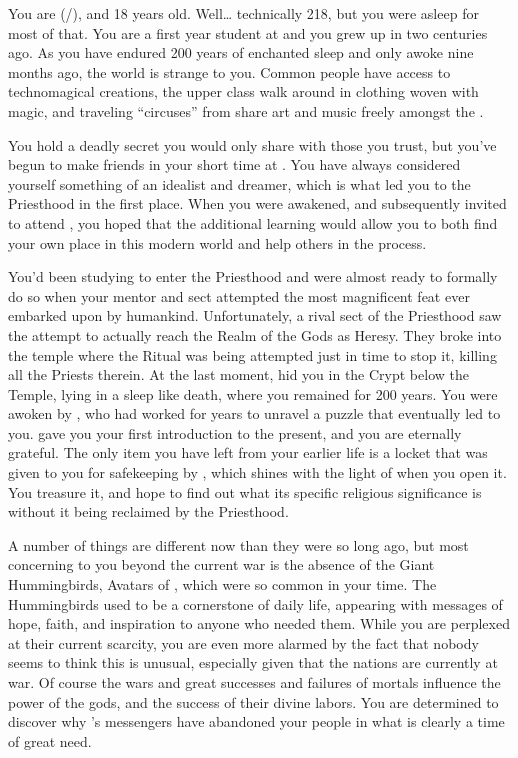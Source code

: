 \documentclass[char]{GL2020}
\begin{document}
\name{\cDisney{}}


You are \cDisney{} (\cDisney{\they}/\cDisney{\them}), and 18 years old. Well… technically 218, but you were asleep for most of that. You are a first year student at \pSchool{} and you grew up in \pFarm{} two centuries ago. As you have endured 200 years of enchanted sleep and only awoke nine months ago, the world is strange to you.  Common people have access to technomagical creations, the upper class walk around in clothing woven with magic, and traveling “circuses” from \pTech{} share art and music freely amongst the \pFarmers{}.

You hold a deadly secret you would only share with those you trust, but you’ve begun to make friends in your short time at \pSchool{}. You have always considered yourself something of an idealist and dreamer, which is what led you to the Priesthood in the first place.  When you were awakened, and subsequently invited to attend \pSchool{}, you hoped that the additional learning would allow you to both find your own place in this modern world and help others in the process.

You’d been studying to enter the Priesthood and were almost ready to formally do so when your mentor \cDisneyMentor{} and \cDisneyMentor{\their} sect attempted the most magnificent feat ever embarked upon by humankind.  Unfortunately, a rival sect of the Priesthood saw the attempt to actually reach the Realm of the Gods as Heresy.  They broke into the temple where the Ritual was being attempted just in time to stop it, killing all the Priests therein.  At the last moment, \cDisneyMentor{} hid you in the Crypt below the Temple, lying in a sleep like death, where you remained for 200 years.  You were awoken by \cWildCard{}, who had worked for years to unravel a puzzle that eventually led \cWildCard{\them} to you. \cWildCard{} gave you your first introduction to the present, and you are eternally grateful. The only item you have left from your earlier life is a locket that was given to you for safekeeping by \cDisneyMentor{}, which shines with the light of \cFarmGod{} when you open it. You treasure it, and hope to find out what its specific religious significance is without it being reclaimed by the Priesthood.

A number of things are different now than they were so long ago, but most concerning to you beyond the current war is the absence of the Giant Hummingbirds, Avatars of \cFarmGod{}, which were so common in your time. The Hummingbirds used to be a cornerstone of daily life, appearing with messages of hope, faith, and inspiration to anyone who needed them. While you are perplexed at their current scarcity, you are even more alarmed by the fact that nobody seems to think this is unusual, especially given that the nations are currently at war. Of course the wars and great successes and failures of mortals influence the power of the gods, and the success of their divine labors. You are determined to discover why \cFarmGod{}’s messengers have abandoned your people in what is clearly a time of great need.
\end{document}
